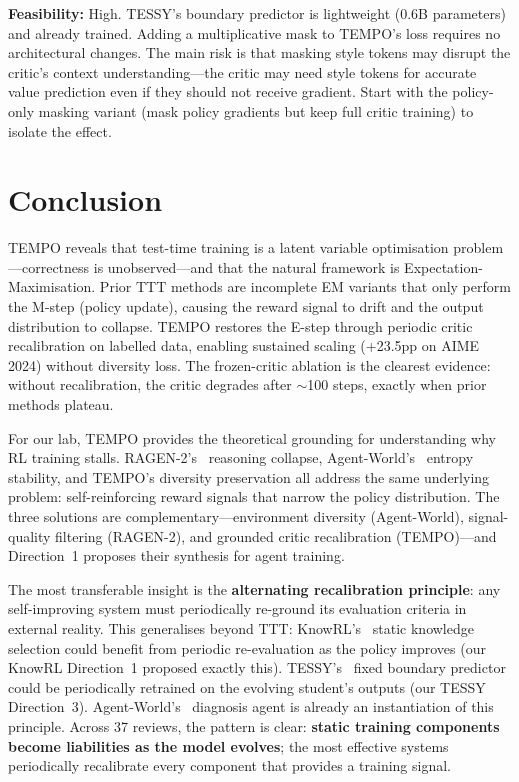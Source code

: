 \documentclass[11pt]{article}
\begin{document}
\textbf{Feasibility:} High. TESSY's boundary predictor is lightweight (0.6B parameters) and already trained. Adding a multiplicative mask to TEMPO's loss requires no architectural changes. The main risk is that masking style tokens may disrupt the critic's context understanding---the critic may need style tokens for accurate value prediction even if they should not receive gradient. Start with the policy-only masking variant (mask policy gradients but keep full critic training) to isolate the effect.

\section{Conclusion}

TEMPO reveals that test-time training is a latent variable optimisation problem---correctness is unobserved---and that the natural framework is Expectation-Maximisation. Prior TTT methods are incomplete EM variants that only perform the M-step (policy update), causing the reward signal to drift and the output distribution to collapse. TEMPO restores the E-step through periodic critic recalibration on labelled data, enabling sustained scaling (+23.5pp on AIME 2024) without diversity loss. The frozen-critic ablation is the clearest evidence: without recalibration, the critic degrades after $\sim$100 steps, exactly when prior methods plateau.

For our lab, TEMPO provides the theoretical grounding for understanding why RL training stalls. RAGEN-2's~\cite{ragen2} reasoning collapse, Agent-World's~\cite{agentworld} entropy stability, and TEMPO's diversity preservation all address the same underlying problem: self-reinforcing reward signals that narrow the policy distribution. The three solutions are complementary---environment diversity (Agent-World), signal-quality filtering (RAGEN-2), and grounded critic recalibration (TEMPO)---and Direction~1 proposes their synthesis for agent training.

The most transferable insight is the \textbf{alternating recalibration principle}: any self-improving system must periodically re-ground its evaluation criteria in external reality. This generalises beyond TTT: KnowRL's~\cite{knowrl} static knowledge selection could benefit from periodic re-evaluation as the policy improves (our KnowRL Direction~1 proposed exactly this). TESSY's~\cite{tessy} fixed boundary predictor could be periodically retrained on the evolving student's outputs (our TESSY Direction~3). Agent-World's~\cite{agentworld} diagnosis agent is already an instantiation of this principle. Across 37 reviews, the pattern is clear: \textbf{static training components become liabilities as the model evolves}; the most effective systems periodically recalibrate every component that provides a training signal.
\end{document}
